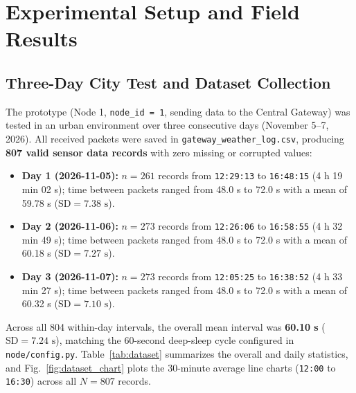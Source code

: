 \documentclass[conference,onecolumn]{IEEEtran}
\begin{document}
\section{Experimental Setup and Field Results}

\subsection{Three-Day City Test and Dataset Collection}
The prototype (Node 1, \texttt{node\_id = 1}, sending data to the Central Gateway) was tested in an urban environment over three consecutive days (November 5--7, 2026). All received packets were saved in \texttt{gateway\_weather\_log.csv}, producing \textbf{807 valid sensor data records} with zero missing or corrupted values:
\begin{itemize}
    \item \textbf{Day 1 (2026-11-05):} $n = 261$ records from \texttt{12:29:13} to \texttt{16:48:15} (4 h 19 min 02 s); time between packets ranged from 48.0 s to 72.0 s with a mean of 59.78 s ($\text{SD} = 7.38\text{ s}$).
    \item \textbf{Day 2 (2026-11-06):} $n = 273$ records from \texttt{12:26:06} to \texttt{16:58:55} (4 h 32 min 49 s); time between packets ranged from 48.0 s to 72.0 s with a mean of 60.18 s ($\text{SD} = 7.27\text{ s}$).
    \item \textbf{Day 3 (2026-11-07):} $n = 273$ records from \texttt{12:05:25} to \texttt{16:38:52} (4 h 33 min 27 s); time between packets ranged from 48.0 s to 72.0 s with a mean of 60.32 s ($\text{SD} = 7.10\text{ s}$).
\end{itemize}
Across all 804 within-day intervals, the overall mean interval was \textbf{60.10 s} ($\text{SD} = 7.24\text{ s}$), matching the 60-second deep-sleep cycle configured in \texttt{node/config.py}. Table~\ref{tab:dataset} summarizes the overall and daily statistics, and Fig.~\ref{fig:dataset_chart} plots the 30-minute average line charts (\texttt{12:00} to \texttt{16:30}) across all $N = 807$ records.
\end{document}
